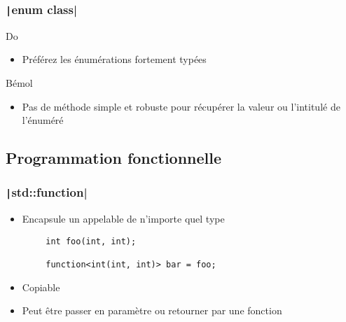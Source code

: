 \documentclass[C++.tex]{subfiles}
\begin{document}
\begin{frame}[fragile]
\end{frame}

\begin{frame}[fragile]
	\frametitle{\texttt|enum class|}
	\begin{exampleblock}{Do}
		\begin{itemize}
			\item Préférez les énumérations fortement typées
		\end{itemize}
	\end{exampleblock}

	\begin{block}{Bémol}
		\begin{itemize}
			\item Pas de méthode simple et robuste pour récupérer la valeur ou l'intitulé de l'énuméré
		\end{itemize}
	\end{block}
\end{frame}

\subsection*{Programmation fonctionnelle}
\begin{frame}[fragile]
	\frametitle{\texttt|std::function|}

	\begin{itemize}
		\item Encapsule un appelable de n'importe quel type
	\end{itemize}

	\begin{verbatim}
		int foo(int, int);

		function<int(int, int)> bar = foo;
	\end{verbatim}

	\begin{itemize}
		\item Copiable
		\item Peut être passer en paramètre ou retourner par une fonction
	\end{itemize}
\end{frame}
\end{document}
